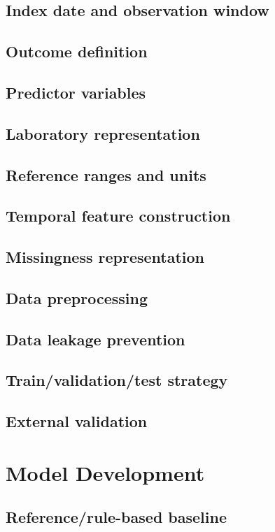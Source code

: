 \documentclass[10pt,journal]{IEEEtran}
\begin{document}
\subsection{Index date and observation window}
\subsection{Outcome definition}
\subsection{Predictor variables}
\subsection{Laboratory representation}
\subsection{Reference ranges and units}
\subsection{Temporal feature construction}
\subsection{Missingness representation}
\subsection{Data preprocessing}
\subsection{Data leakage prevention}
\subsection{Train/validation/test strategy}
\subsection{External validation}

\section{Model Development}
\subsection{Reference/rule-based baseline}
\end{document}
